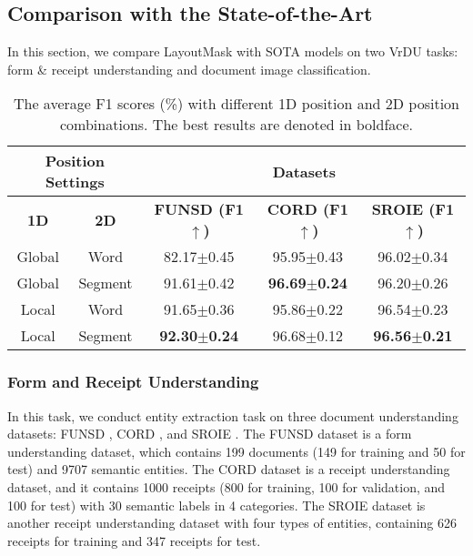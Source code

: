 \documentclass[11pt]{article}
\begin{document}
\subsection{Comparison with the State-of-the-Art}
In this section, we compare LayoutMask with SOTA models on two VrDU tasks: form \& receipt understanding and document image classification.
\begin{table*}[!t]
\centering
\small
\begin{tabular}{cc|ccc}
\hline
\multicolumn{2}{c|}{\textbf{Position Settings}} & \multicolumn{3}{c}{\textbf{Datasets}}               \\ \hline
\textbf{1D}        & \textbf{2D}       & \textbf{FUNSD (F1$\uparrow$)}      & \textbf{CORD (F1$\uparrow$)}       & \textbf{SROIE (F1$\uparrow$)}      \\ \hline
Global                      & Word                       & 82.17$\pm$0.45          & 95.95$\pm$0.43          & 96.02$\pm$0.34          \\ \hline
Global                      & Segment                    & 91.61$\pm$0.42          & \textbf{96.69$\pm$0.24}          & 96.20$\pm$0.26          \\ \hline
Local                       & Word                       & 91.65$\pm$0.36          & 95.86$\pm$0.22          & 96.54$\pm$0.23          \\ \hline
Local                       & Segment                    & \textbf{92.30$\pm$0.24} & 96.68$\pm$0.12 & \textbf{96.56$\pm$0.21} \\ \hline
\end{tabular}
\caption{\label{ablation-on-position}
 The average F1 scores (\%) with different 1D position and 2D position combinations. The best results are denoted in boldface.
}
\end{table*}

\subsubsection{Form and Receipt Understanding}


In this task, we conduct entity extraction task on three document understanding datasets: FUNSD \citep{jaume2019funsd}, CORD \citep{park2019cord}, and SROIE \citep{huang2019icdar2019}.
The FUNSD dataset is a form understanding dataset, which contains 199 documents (149 for training and 50 for test) and 9707 semantic entities.
The CORD dataset is a receipt understanding dataset, and it contains 1000 receipts (800 for training, 100 for validation, and 100 for test) with 30 semantic labels in 4 categories.
The SROIE dataset is another receipt understanding dataset with four types of entities, containing 626 receipts for training and 347 receipts for test.
\end{document}
